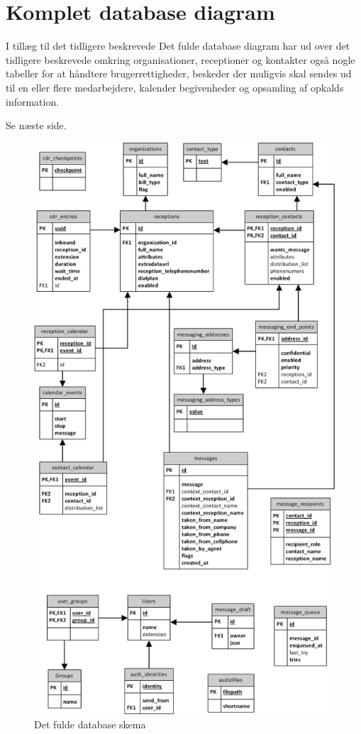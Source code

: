 \chapter{Komplet database diagram}
I tillæg til det tidligere beskrevede 
Det fulde database diagram har ud over det tidligere beskrevede omkring organisationer, receptioner og kontakter også nogle tabeller for at håndtere brugerrettigheder, beskeder der muligvis skal sendes ud til en eller flere medarbejdere, kalender begivenheder og opsamling af opkalds information.


Se næste side.

\pagebreak
\begin{figure}[ht!]
\centering
\includegraphics[height=\textheight]{images/ER_Full.png}
\caption{Det fulde database skema}
\label{fig:erfull}
\end{figure}
